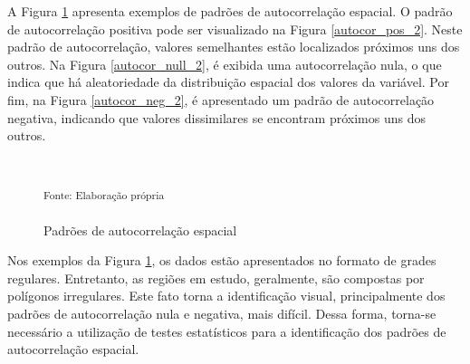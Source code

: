 \documentclass[12pt,a4paper]{article}
\begin{document}
A Figura \ref{autocorrelacao_2}	apresenta exemplos de padrões de autocorrelação espacial. O padrão de autocorrelação positiva pode ser visualizado na Figura \ref{autocor_pos_2}. Neste padrão de autocorrelação, valores semelhantes estão localizados próximos uns dos outros. Na Figura \ref{autocor_null_2}, é exibida uma autocorrelação nula, o que indica que há aleatoriedade da distribuição espacial dos valores da variável. Por fim, na Figura \ref{autocor_neg_2}, é apresentado um padrão de autocorrelação negativa, indicando que valores dissimilares se encontram próximos uns dos outros. 
 
\begin{figure}[H]
	\centering
	\caption{Padrões de autocorrelação espacial}
	\small
	\hspace{0.2cm}
	\hspace{0.2cm}
	\\
	\parbox{\dimexpr\linewidth-8cm}{\raggedright
    \strut \textsuperscript{Fonte: Elaboração própria}\strut}
	\label{autocorrelacao_2}
\end{figure}
	
Nos exemplos da Figura \ref{autocorrelacao_2}, os dados estão apresentados no formato de grades regulares. Entretanto, as regiões em estudo, geralmente, são compostas por polígonos irregulares. Este fato torna a identificação visual, principalmente dos padrões de autocorrelação nula e negativa, mais difícil. Dessa forma, torna-se necessário a utilização de testes estatísticos para a identificação dos padrões de autocorrelação espacial. 
	
\end{document}
